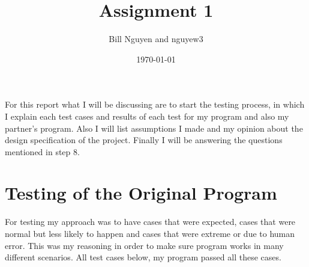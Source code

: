 \documentclass[12pt]{article}
\title{Assignment 1}
\author{Bill Nguyen and nguyew3}
\date{\today}
\begin{document}
\maketitle

For this report what I will be discussing are to start the testing process, in which I explain each test cases and results of each test for my program and also my partner's program. Also I will list assumptions I made and my opinion about the design specification of the project. Finally I will be answering the questions mentioned in step 8.

\section{Testing of the Original Program}
For testing my approach was to have cases that were expected, cases that were normal but less likely to happen and cases that were extreme or due to human error. This was my reasoning in order to make sure program works in many different scenarios. All test cases below, my program passed all these cases.
\end{document}
